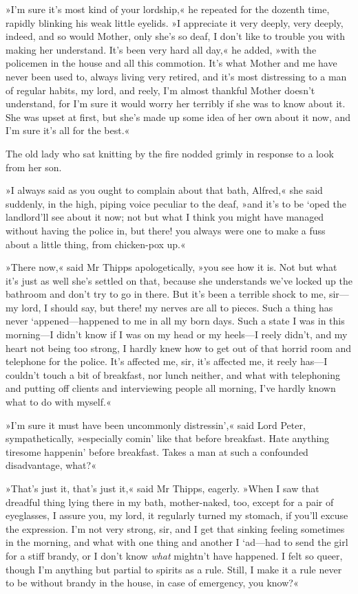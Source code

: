 »I'm sure it's most kind of your lordship,« he repeated for the dozenth time, rapidly blinking his weak little eyelids. »I appreciate it very deeply, very deeply, indeed, and so would Mother, only she's so deaf, I don't like to trouble you with making her understand. It's been very hard all day,« he added, »with the policemen in the house and all this commotion. It's what Mother and me have never been used to, always living very retired, and it's most distressing to a man of regular habits, my lord, and reely, I'm almost thankful Mother doesn't understand, for I'm sure it would worry her terribly if she was to know about it. She was upset at first, but she's made up some idea of her own about it now, and I'm sure it's all for the best.«

The old lady who sat knitting by the fire nodded grimly in response to a look from her son.

»I always said as you ought to complain about that bath, Alfred,« she said suddenly, in the high, piping voice peculiar to the deaf, »and it's to be `oped the landlord'll see about it now; not but what I think you might have managed without having the police in, but there! you always were one to make a fuss about a little thing, from chicken-pox up.«

»There now,« said Mr Thipps apologetically, »you see how it is. Not but what it's just as well she's settled on that, because she understands we've locked up the bathroom and don't try to go in there. But it's been a terrible shock to me, sir—my lord, I should say, but there! my nerves are all to pieces. Such a thing has never `appened—happened to me in all my born days. Such a state I was in this morning—I didn't know if I was on my head or my heels—I reely didn't, and my heart not being too strong, I hardly knew how to get out of that horrid room and telephone for the police. It's affected me, sir, it's affected me, it reely has—I couldn't touch a bit of breakfast, nor lunch neither, and what with telephoning and putting off clients and interviewing people all morning, I've hardly known what to do with myself.«

»I'm sure it must have been uncommonly distressin',« said Lord Peter, sympathetically, »especially comin' like that before breakfast. Hate anything tiresome happenin' before breakfast. Takes a man at such a confounded disadvantage, what?«

»That's just it, that's just it,« said Mr Thipps, eagerly. »When I saw that dreadful thing lying there in my bath, mother-naked, too, except for a pair of eyeglasses, I assure you, my lord, it regularly turned my stomach, if you'll excuse the expression. I'm not very strong, sir, and I get that sinking feeling sometimes in the morning, and what with one thing and another I `ad—had to send the girl for a stiff brandy, or I don't know \textit{what} mightn't have happened. I felt so queer, though I'm anything but partial to spirits as a rule. Still, I make it a rule never to be without brandy in the house, in case of emergency, you know?«

